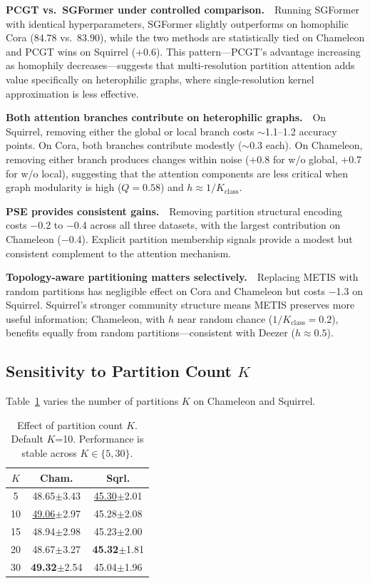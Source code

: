 \documentclass[sigconf]{acmart}
\newcommand{\best}[1]{\textcolor{bestcolor}{\textbf{#1}}}
\newcommand{\runup}[1]{\textcolor{runnerup}{\underline{#1}}}
\begin{document}
\textbf{PCGT vs.\ SGFormer under controlled comparison.}~~Running SGFormer with identical hyperparameters, SGFormer slightly outperforms on homophilic Cora ($84.78$ vs.\ $83.90$), while the two methods are statistically tied on Chameleon and PCGT wins on Squirrel ($+$0.6). This pattern---PCGT's advantage increasing as homophily decreases---suggests that multi-resolution partition attention adds value specifically on heterophilic graphs, where single-resolution kernel approximation is less effective.

\textbf{Both attention branches contribute on heterophilic graphs.}~~On Squirrel, removing either the global or local branch costs $\sim$1.1--1.2 accuracy points. On Cora, both branches contribute modestly ($\sim$0.3 each). On Chameleon, removing either branch produces changes within noise ($+$0.8 for w/o global, $+$0.7 for w/o local), suggesting that the attention components are less critical when graph modularity is high ($Q = 0.58$) and $h \approx 1/K_{\text{class}}$.

\textbf{PSE provides consistent gains.}~~Removing partition structural encoding costs $-$0.2 to $-$0.4 across all three datasets, with the largest contribution on Chameleon ($-$0.4). Explicit partition membership signals provide a modest but consistent complement to the attention mechanism.

\textbf{Topology-aware partitioning matters selectively.}~~Replacing METIS with random partitions has negligible effect on Cora and Chameleon but costs $-$1.3 on Squirrel. Squirrel's stronger community structure means METIS preserves more useful information; Chameleon, with $h$ near random chance ($1/K_{\text{class}} = 0.2$), benefits equally from random partitions---consistent with Deezer ($h \approx 0.5$).

\subsection{Sensitivity to Partition Count \texorpdfstring{$K$}{K}}

Table~\ref{tab:ksweep} varies the number of partitions $K$ on Chameleon and Squirrel.

\begin{table}[t]
\centering
{
\begin{tabular}{c|cc}
\toprule
$K$ & \textbf{Cham.} & \textbf{Sqrl.} \\
\midrule
5  & 48.65{\scriptsize$\pm$3.43} & \runup{45.30}{\scriptsize$\pm$2.01} \\
10 & \runup{49.06}{\scriptsize$\pm$2.97} & 45.28{\scriptsize$\pm$2.08} \\
15 & 48.94{\scriptsize$\pm$2.98} & 45.23{\scriptsize$\pm$2.00} \\
20 & 48.67{\scriptsize$\pm$3.27} & \best{45.32}{\scriptsize$\pm$1.81} \\
30 & \best{49.32}{\scriptsize$\pm$2.54} & 45.04{\scriptsize$\pm$1.96} \\
\bottomrule
\end{tabular}
}
\caption{Effect of partition count $K$. Default $K$=10. Performance is stable across $K \in \{5, 30\}$.}
\label{tab:ksweep}
\end{table}
\end{document}
